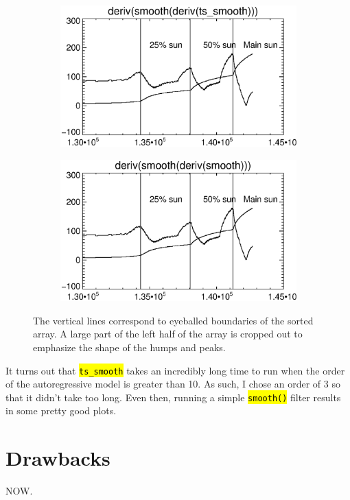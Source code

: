 \documentclass[10pt]{article}
\begin{document}
\begin{figure}[!h]
    \hspace{-1.0in}
    \begin{subfigure}[b]{.45\linewidth}
        \centering
        \includegraphics[width=1.3\textwidth]{plots_tables_images/d_s_d_ts.eps}
    \end{subfigure}
    \hspace{.5in}
    \begin{subfigure}[b]{.45\linewidth}
        \centering
        \includegraphics[width=1.3\textwidth]{plots_tables_images/d_s_d_reg.eps}
    \end{subfigure}
    \caption{The vertical lines correspond to eyeballed boundaries of the sorted array. A large part of the left half of the array is cropped out to emphasize the shape of the humps and peaks.}
    \label{comps}
\end{figure}

It turns out that \texttt{\hl{ts\_smooth}} takes an incredibly long time to run when the order of the autoregressive model is greater than 10. As such, I chose an order of 3 so that it didn't take too long. Even then, running a simple \hl{\texttt{smooth()}} filter results in some pretty good plots.



\section{Drawbacks} %
\label{sec:drawbacks}
NOW. 
\end{document}
